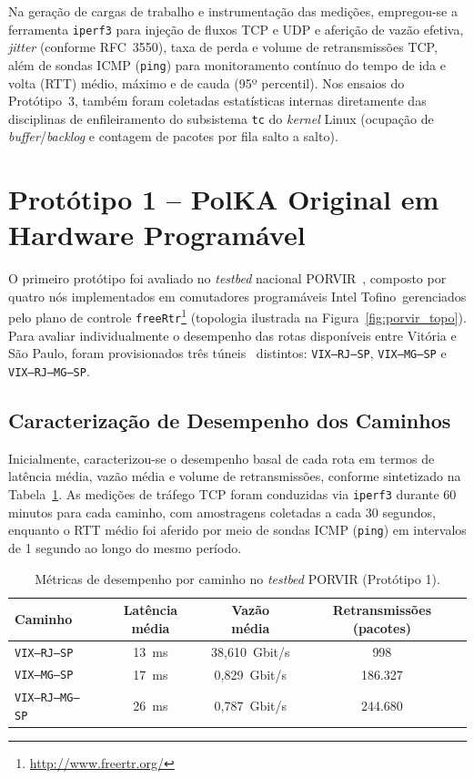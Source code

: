 Na geração de cargas de trabalho e instrumentação das medições, empregou-se a ferramenta \texttt{iperf3} para injeção de fluxos TCP e UDP e aferição de vazão efetiva, \textit{jitter} (conforme RFC~3550), taxa de perda e volume de retransmissões TCP, além de sondas ICMP (\texttt{ping}) para monitoramento contínuo do tempo de ida e volta (RTT) médio, máximo e de cauda (95º percentil). Nos ensaios do Protótipo~3, também foram coletadas estatísticas internas diretamente das disciplinas de enfileiramento do subsistema \texttt{tc} do \textit{kernel} Linux (ocupação de \textit{buffer}/\textit{backlog} e contagem de pacotes por fila salto a salto).

\section{Protótipo 1 -- PolKA Original em Hardware Programável}
\label{sec:res_prototipo1}

O primeiro protótipo foi avaliado no \textit{testbed} nacional PORVIR~\cite{Nogueira2025}, composto por quatro nós implementados em comutadores programáveis Intel Tofino\textregistered\ gerenciados pelo plano de controle \texttt{freeRtr}\footnote{\url{http://www.freertr.org/}} (topologia ilustrada na Figura~\ref{fig:porvir_topo}). Para avaliar individualmente o desempenho das rotas disponíveis entre Vitória e São Paulo, foram provisionados três túneis \polka\ distintos: \texttt{VIX--RJ--SP}, \texttt{VIX--MG--SP} e \texttt{VIX--RJ--MG--SP}.

\subsection{Caracterização de Desempenho dos Caminhos}
\label{subsec:porvir_caracterizacao}

Inicialmente, caracterizou-se o desempenho basal de cada rota em termos de latência média, vazão média e volume de retransmissões, conforme sintetizado na Tabela~\ref{tab:metricas_porvir}. As medições de tráfego TCP foram conduzidas via \texttt{iperf3} durante 60 minutos para cada caminho, com amostragens coletadas a cada 30 segundos, enquanto o RTT médio foi aferido por meio de sondas ICMP (\texttt{ping}) em intervalos de 1 segundo ao longo do mesmo período.

\begin{table}[htbp]
\centering
\caption{Métricas de desempenho por caminho no \textit{testbed} PORVIR (Protótipo 1).}
\label{tab:metricas_porvir}
\begin{tabularx}{\textwidth}{Xccc}
\toprule
\textbf{Caminho} & \textbf{Latência média} & \textbf{Vazão média} & \textbf{Retransmissões (pacotes)} \\
\midrule
\texttt{VIX--RJ--SP}     & 13~ms & 38,610~Gbit/s & 998 \\
\texttt{VIX--MG--SP}     & 17~ms & 0,829~Gbit/s  & 186.327 \\
\texttt{VIX--RJ--MG--SP} & 26~ms & 0,787~Gbit/s  & 244.680 \\
\bottomrule
\end{tabularx}
\end{table}

